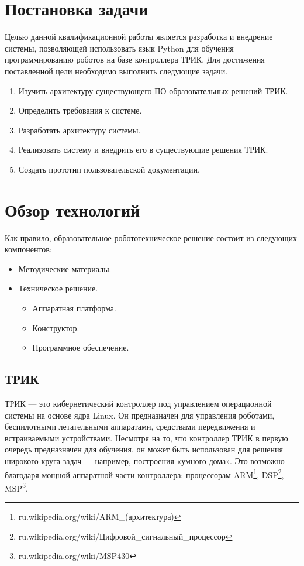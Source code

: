 \documentclass[14pt]{matmex-diploma-custom}
\begin{document}
\section*{Постановка задачи}

Целью данной квалификационной работы является разработка и внедрение системы, позволяющей использовать язык Python для обучения программированию роботов на базе контроллера ТРИК. Для достижения поставленной цели необходимо выполнить следующие задачи.

\begin{enumerate}
\item Изучить архитектуру существующего ПО образовательных решений ТРИК.
\item Определить требования к системе.
\item Разработать архитектуру системы.
\item Реализовать систему и внедрить его в существующие решения ТРИК.
\item Создать прототип пользовательской документации.
\end{enumerate}

\section{Обзор технологий}

Как правило, образовательное робототехническое решение состоит из следующих компонентов:
\begin{itemize}
    \item Методические материалы.
    \item Техническое решение.
        \begin{itemize}
            \item Аппаратная платформа.
            \item Конструктор.
            \item Программное обеспечение.
        \end{itemize}
\end{itemize}

\subsection{ТРИК}
ТРИК — это кибернетический контроллер под управлением операционной системы на основе ядра Linux. Он предназначен для управления роботами, беспилотными летательными аппаратами, средствами передвижения и встраиваемыми устройствами. Несмотря на то, что контроллер ТРИК в первую очередь предназначен для обучения, он может быть использован для решения широкого круга задач — например, построения «умного дома». Это возможно благодаря мощной аппаратной части контроллера: процессорам ARM\footnote{ru.wikipedia.org/wiki/ARM\_(архитектура)}, DSP\footnote{ru.wikipedia.org/wiki/Цифровой\_сигнальный\_процессор}, MSP\footnote{ru.wikipedia.org/wiki/MSP430}.
\end{document}
